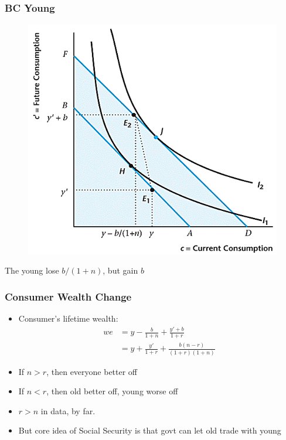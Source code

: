 \documentclass{beamer}
\begin{document}
\begin{frame}
\frametitle[alignment=center]{BC Young}
\begin{figure}
\centering
\includegraphics[scale=0.5]{Figures/W_Fig_10pt9.png}
\end{figure}
The young lose $b/(1+n)$, but gain $b$
 \end{frame}
 
 \begin{frame}
\frametitle[alignment=center]{Consumer Wealth Change}
\begin{itemize}
\item Consumer's lifetime wealth:
\begin{align*}
we & =y-\frac{b}{1+n}+\frac{y'+b}{1+r}\\
 & = y+\frac{y'}{1+r}+\frac{b(n-r)}{(1+r)(1+n)}
\end{align*}
\item If $n>r$, then everyone better off
\bigskip
\item If $n<r$, then old better off, young worse off
\bigskip
\item $r>n$ in data, by far.
\bigskip
\item But core idea of Social Security is that govt can let old trade with young
\end{itemize}
 \end{frame}
\end{document}
